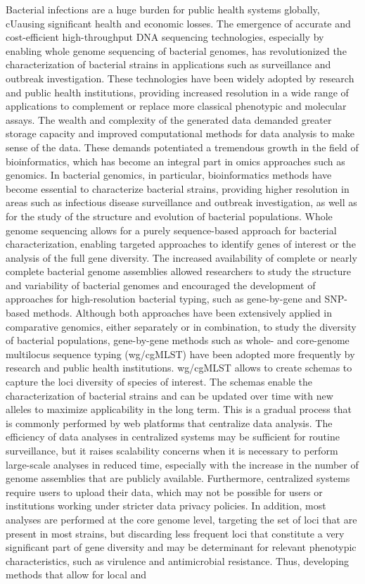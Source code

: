 


Bacterial infections are a huge burden for public health systems globally, cUausing significant health and economic losses. The emergence of accurate and cost-efficient high-throughput DNA sequencing technologies, especially by enabling whole genome sequencing of bacterial genomes, has revolutionized the characterization of bacterial strains in applications such as surveillance and outbreak investigation. These technologies have been widely adopted by research and public health institutions, providing increased resolution in a wide range of applications to complement or replace more classical phenotypic and molecular assays. The wealth and complexity of the generated data demanded greater storage capacity and improved computational methods for data analysis to make sense of the data. These demands potentiated a tremendous growth in the field of bioinformatics, which has become an integral part in omics approaches such as genomics. In bacterial genomics, in particular, bioinformatics methods have become essential to characterize bacterial strains, providing higher resolution in areas such as infectious disease surveillance and outbreak investigation, as well as for the study of the structure and evolution of bacterial populations. Whole genome sequencing allows for a purely sequence-based approach for bacterial characterization, enabling targeted approaches to identify genes of interest or the analysis of the full gene diversity. The increased availability of complete or nearly complete bacterial genome assemblies allowed researchers to study the structure and variability of bacterial genomes and encouraged the development of approaches for high-resolution bacterial typing, such as gene-by-gene and SNP-based methods. Although both approaches have been extensively applied in comparative genomics, either separately or in combination, to study the diversity of bacterial populations, gene-by-gene methods such as whole- and core-genome multilocus sequence typing (wg/cgMLST) have been adopted more frequently by research and public health institutions. wg/cgMLST allows to create schemas to capture the loci diversity of species of interest. The schemas enable the characterization of bacterial strains and can be updated over time with new alleles to maximize applicability in the long term. This is a gradual process that is commonly performed by web platforms that centralize data analysis. The efficiency of data analyses in centralized systems may be sufficient for routine surveillance, but it raises scalability concerns when it is necessary to perform large-scale analyses in reduced time, especially with the increase in the number of genome assemblies that are publicly available. Furthermore, centralized systems require users to upload their data, which may not be possible for users or institutions working under stricter data privacy policies. In addition, most analyses are performed at the core genome level, targeting the set of loci that are present in most strains, but discarding less frequent loci that constitute a very significant part of gene diversity and may be determinant for relevant phenotypic characteristics, such as virulence and antimicrobial resistance. Thus, developing methods that allow for local and 